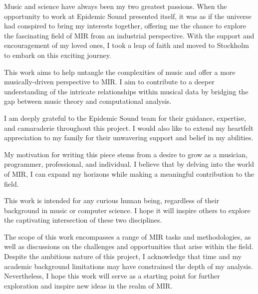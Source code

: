 \begin{preface}

Music and science have always been my two greatest passions. When the opportunity to work at Epidemic Sound presented itself, it was as if the universe had conspired to bring my interests together, offering me the chance to explore the fascinating field of MIR from an industrial perspective. With the support and encouragement of my loved ones, I took a leap of faith and moved to Stockholm to embark on this exciting journey.

This work aims to help untangle the complexities of music and offer a more musically-driven perspective to MIR. I aim to contribute to a deeper understanding of the intricate relationships within musical data by bridging the gap between music theory and computational analysis.

I am deeply grateful to the Epidemic Sound team for their guidance, expertise, and camaraderie throughout this project. I would also like to extend my heartfelt appreciation to my family for their unwavering support and belief in my abilities.

My motivation for writing this piece stems from a desire to grow as a musician, programmer, professional, and individual. I believe that by delving into the world of MIR, I can expand my horizons while making a meaningful contribution to the field.

This work is intended for any curious human being, regardless of their background in music or computer science. I hope it will inspire others to explore the captivating intersection of these two disciplines.

The scope of this work encompasses a range of MIR tasks and methodologies, as well as discussions on the challenges and opportunities that arise within the field. Despite the ambitious nature of this project, I acknowledge that time and my academic background limitations may have constrained the depth of my analysis. Nevertheless, I hope this work will serve as a starting point for further exploration and inspire new ideas in the realm of MIR.

\newpage
\end{preface}